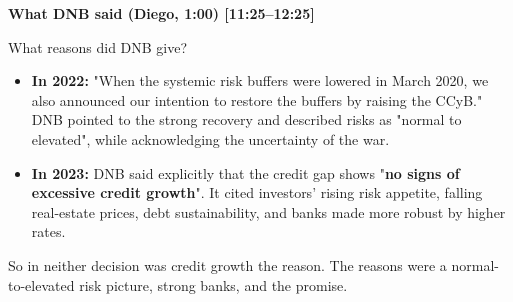{\small\textbf{What DNB said (Diego, 1:00) [11:25–12:25]}}\par\smallskip
What reasons did DNB give?
\begin{itemize}\setlength\itemsep{0pt}
\item \textbf{In 2022:} "When the systemic risk buffers were lowered in March 2020, we also announced our intention to restore the buffers by raising the CCyB." DNB pointed to the strong recovery and described risks as "normal to elevated", while acknowledging the uncertainty of the war.
\item \textbf{In 2023:} DNB said explicitly that the credit gap shows "\textbf{no signs of excessive credit growth}". It cited investors' rising risk appetite, falling real-estate prices, debt sustainability, and banks made more robust by higher rates.
\end{itemize}
\par\smallskip
So in neither decision was credit growth the reason. The reasons were a normal-to-elevated risk picture, strong banks, and the promise.
